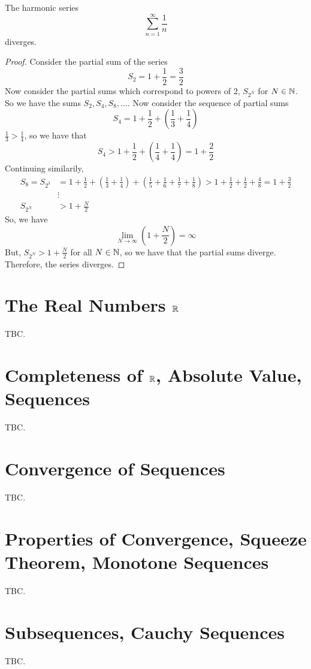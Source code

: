 \documentclass[openany]{report}
\begin{document}
    \begin{manualprop}{}
        The harmonic series 
        \[\sum_{n=1}^\infty \frac{1}{n}\]
        diverges. 
    \end{manualprop}
\begin{proof}
    Consider the partial sum of the series 
    \[S_2 = 1 + \frac{1}{2} = \frac{3}{2}\]
    Now consider the partial sums which correspond to powers of 2, $S_{2^N}$ for $N \in \mathbb{N}$. So we have the sums $S_2, S_4, S_8,\dots$. Now consider the sequence of partial sums
    \[S_4 = 1 + \frac{1}{2} + \left(\frac{1}{3} + \frac{1}{4}\right)\]
    $\frac{1}{3} > \frac{1}{4}$, so we have that 
    \[S_4 > 1 + \frac{1}{2} + \left(\frac{1}{4} + \frac{1}{4}\right) = 1 + \frac{2}{2}\]
    Continuing similarily,
    \begin{align*}
        S_8 = S_{2^3} &= 1 + \frac{1}{2} + \left(\frac{1}{3} + \frac{1}{4}\right) + \left(\frac{1}{5} + \frac{1}{6} + \frac{1}{7} + \frac{1}{8}\right) > 1 + \frac{1}{2} + \frac{1}{2} + \frac{4}{8} = 1 + \frac{3}{2}\\
        &\vdots\\
        S_{2^N} &> 1 + \frac{N}{2}
    \end{align*}
    So, we have
    \[\lim_{N\rightarrow \infty} \left(1 + \frac{N}{2}\right) = \infty\]
    But, $S_{2^N} > 1 + \frac{N}{2}$ for all $N \in \mathbb{N}$, so we have that the partial sums diverge. Therefore, the series diverges.

     
\end{proof}





\chapter{The Real Numbers $\mathbb{R}$}
TBC.
\chapter{Completeness of $\mathbb{R}$, Absolute Value, Sequences }
TBC.
\chapter{Convergence of Sequences}
TBC. 
\chapter{Properties of Convergence, Squeeze Theorem, Monotone Sequences}
TBC. 
\chapter{Subsequences, Cauchy Sequences}
TBC.
\end{document}
